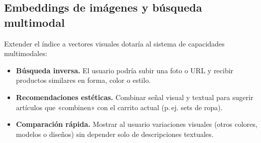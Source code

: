 \subsection{Embeddings de imágenes y búsqueda multimodal}

Extender el índice a vectores visuales dotaría al sistema de capacidades multimodales:

\begin{itemize}
    \item \textbf{Búsqueda inversa.} El usuario podría subir una foto o URL y recibir productos similares en forma, color o estilo.
    \item \textbf{Recomendaciones estéticas.} Combinar señal visual y textual para sugerir artículos que «combinen» con el carrito actual (p.\,ej. sets de ropa).
    \item \textbf{Comparación rápida.} Mostrar al usuario variaciones visuales (otros colores, modelos o diseños) sin depender solo de descripciones textuales.
\end{itemize}
